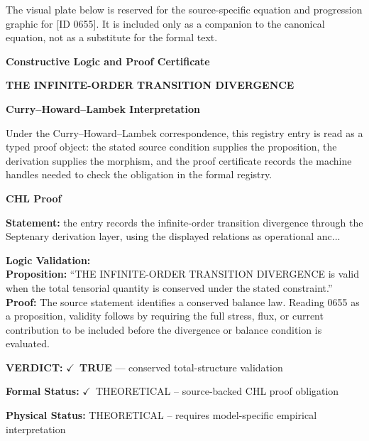 \begingroup\footnotesize\sloppy
The visual plate below is reserved for the source-specific equation and progression graphic for [ID 0655]. It is included only as a companion to the canonical equation, not as a substitute for the formal text.
\par\endgroup
\ifTZPDarkEdition
{}
\fi

\clearpage
\begingroup\tzpsupportsetup
\noindent\textbf{\fontsize{10.8pt}{12.8pt}\selectfont [ID 0655] Constructive Logic and Proof Certificate}\par
\noindent\textbf{\fontsize{10pt}{12pt}\selectfont THE INFINITE-ORDER TRANSITION DIVERGENCE}\par
\vspace{0.45em}
\begingroup
\footnotesize
\setlength{\parskip}{0.22em}
\setlength{\parindent}{0pt}
\noindent\textbf{Curry--Howard--Lambek Interpretation}\par
Under the Curry--Howard--Lambek correspondence, this registry entry is read as a typed proof
object: the stated source condition supplies the proposition, the derivation supplies the
morphism, and the proof certificate records the machine handles needed to check the obligation
in the formal registry.

\vspace{0.45em}
\noindent\textbf{CHL Proof}\par
\textbf{Statement:} the entry records the infinite-order transition divergence through the Septenary
derivation layer, using the displayed relations as operational anc...

\textbf{Logic Validation:}\\
\textbf{Proposition:} ``THE INFINITE-ORDER TRANSITION DIVERGENCE is valid when the total tensorial quantity is
conserved under the stated constraint.''\\
\textbf{Proof:} The source statement identifies a conserved balance law. Reading 0655 as a proposition,
validity follows by requiring the full stress, flux, or current contribution to be
included before the divergence or balance condition is evaluated.

\textbf{VERDICT:} \ensuremath{\checkmark}\ \textbf{TRUE} --- conserved total-structure validation

\textbf{Formal Status:} \ensuremath{\checkmark}\ THEORETICAL -- source-backed CHL proof obligation

\textbf{Physical Status:} THEORETICAL -- requires model-specific empirical interpretation
\par\vspace{0.45em}
\par
\ifTZPDarkEdition
{}
\fi
\endgroup
\endgroup

